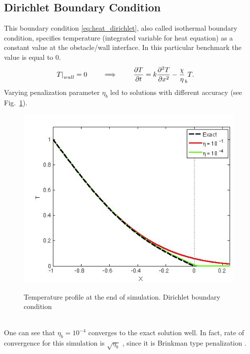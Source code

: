 \subsection{Dirichlet Boundary Condition}
This boundary condition \eqref{eq:heat_dirichlet}, also called isothermal boundary condition, specifies temperature (integrated variable for heat equation) as a constant value at the obstacle/wall interface. In this particular benchmark the value is equal to 0.
\begin{align}
\left.T\right|_{wall} = 0 \qquad \implies \qquad \frac {\partial T}{\partial t} &= k \frac {\partial^2 T}{\partial x^2} - \frac \chi \eta_b T. \label{eq:heat_dirichlet}
\end{align}
Varying penalization parameter $\eta_b$ led to solutions with different accuracy (see Fig.~\ref{fig:heat_dirichlet}).
\begin{figure}[h!]
\centering \includegraphics[scale=0.6]{fig/heat_dirichlet.png}\\
\caption{Temperature profile at the end of simulation. Dirichlet boundary condition \label{fig:heat_dirichlet}}
\end{figure}\\
One can see that $\eta_b = 10^{-4}$ converges to the exact solution well. In fact, rate of convergence for this simulation is $\sqrt{\eta_b}$ \cite{ebd_nk_ovv_cbvp_jcp}, since it is Brinkman type penalization \cite{lib:vp_liu}.

